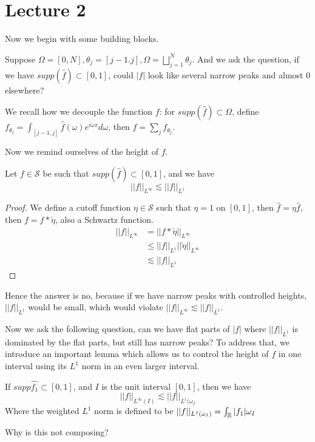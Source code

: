 \section*{Lecture 2}
Now we begin with some building blocks.

Suppose $\Omega=[0,N], \theta_j=[j-1. j], \Omega=\bigsqcup_{j=1}^N\theta_j$. And we ask the question, if we have $supp(\widehat{f})\subset[0,1]$, could $|f|$ look like several narrow peaks and almost 0 elsewhere?

We recall how we decouple the function $f$: for $supp(\widehat{f})\subset\Omega$, define $f_{\theta_j}=\int_{[j-1, j]}\widehat{f}(\omega)e^{i\omega x}d\omega$, then $f=\sum_jf_{\theta_j}$.

Now we remind ourselves of the height of $f$.
\begin{proposition}
    Let $f\in\mathcal{S}$ be such that $supp(\widehat{f})\subset[0,1]$, and we have
    \begin{equation*}
        ||f||_{L^\infty}\lesssim||f||_{L^1}
    \end{equation*}
\end{proposition}
\begin{proof}
    We define a cutoff function $\eta\in\mathcal{S}$ such that $\eta=1$ on $[0,1]$, then $\widehat{f}=\eta\widehat{f}$, then $f=f\ast\check{\eta}$, also a Schwartz function.
\begin{align*}
    ||f||_{L^\infty}&=||f\ast\check{\eta}||_{L^\infty}\\
    &\leq||f||_{L^1}||\check{\eta}||_{L^\infty}\\
    &\lesssim||f||_{L^1}
\end{align*}
\end{proof}
Hence the answer is no, because if we have narrow peaks with controlled heights, $||f||_{L^1}$ would be small, which would violate $||f||_{L^\infty}\lesssim||f||_{L^1}$.

Now we ask the following question, can we have flat parts of $|f|$ where $||f||_{L^1}$ is dominated by the flat parts, but still has narrow peaks? To address that, we introduce an important lemma which allows us to control the height of $f$ in one interval using its $L^1$ norm in an even larger interval.

\begin{proposition}
    If $supp\widehat{f_1}\subset[0,1]$, and $I$ is the unit interval $[0,1]$, then we have
    \begin{equation*}
        ||f||_{L^\infty(I)}\lesssim ||f||_{L^1(\omega_I}
    \end{equation*}
    Where the weighted $L^1$ norm is defined to be $||f||_{L^1(\omega_I)}=\int_{\mathbb{R}}|f_1|\omega_I$
\end{proposition}



Why is this not composing?
